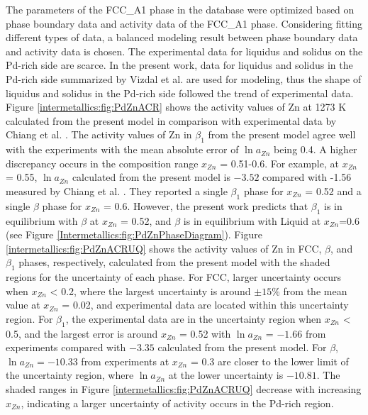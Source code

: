 The parameters of the FCC\_A1 phase in the database were optimized based on phase boundary data and activity data of the FCC\_A1 phase. Considering fitting different types of data, a balanced modeling result between phase boundary data and activity data is chosen. The experimental data for liquidus and solidus on the Pd-rich side are scarce. In the present work, data for liquidus and solidus in the Pd-rich side summarized by Vizdal et al. \cite{vizdal2006experimental} are used for modeling, thus the shape of liquidus and solidus in the Pd-rich side followed the trend of experimental data. Figure \ref{intermetallics:fig:PdZnACR} shows the activity values of Zn at 1273 K calculated from the present model in comparison with experimental data by Chiang et al. \cite{ChiangIpserChang1977}. The activity values of Zn in $\beta_1$ from the present model agree well with the experiments \cite{ChiangIpserChang1977} with the mean absolute error of $\ln{a_{Zn}}$ being 0.4. A higher discrepancy occurs in the composition range $x_{Zn}$ = 0.51-0.6. For example, at $x_{Zn}$ = 0.55, $\ln{a_{Zn}}$ calculated from the present model is $-3.52$ compared with -1.56 measured by Chiang et al. \cite{ChiangIpserChang1977}. They reported a single $\beta_1$ phase for $x_{Zn}$ = 0.52 and a single $\beta$ phase for $x_{Zn}$ = 0.6. However, the present work predicts that $\beta_1$ is in equilibrium with $\beta$ at $x_{Zn}$ = 0.52, and $\beta$ is in equilibrium with Liquid at $x_{Zn}$=0.6 (see Figure \ref{Intermetallics:fig:PdZnPhaseDiagram}). Figure \ref{intermetallics:fig:PdZnACRUQ} shows the activity values of Zn in FCC, $\beta$, and $\beta_1$ phases, respectively, calculated from the present model with the shaded regions for the uncertainty of each phase. For FCC, larger uncertainty occurs when $x_{Zn}$ < 0.2, where the largest uncertainty is around $\pm15$\% from the mean value at $x_{Zn}$ = 0.02, and experimental data are located within this uncertainty region. For $\beta_1$, the experimental data are in the uncertainty region when $x_{Zn}$ < 0.5, and the largest error is around $x_{Zn}$ = 0.52 with $\ln{a_{Zn}}$ = $-1.66$ from experiments \cite{ChiangIpserChang1977} compared with $-3.35$ calculated from the present model. For $\beta$, $\ln{a_{Zn}} = -10.33$ from experiments \cite{ChiangIpserChang1977} at $x_{Zn}$ = 0.3 are closer to the lower limit of the uncertainty region, where $\ln{a_{Zn}}$ at the lower uncertainty is $-10.81$. The shaded ranges in Figure \ref{intermetallics:fig:PdZnACRUQ} decrease with increasing $x_{Zn}$, indicating a larger uncertainty of activity occurs in the Pd-rich region. 

